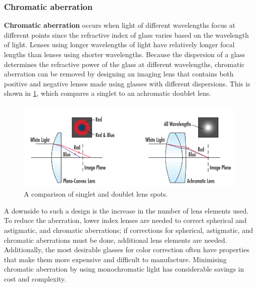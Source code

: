 \documentclass[10pt]{article}
\begin{document}
\begin{multicols}{2}
\subsubsection{Chromatic aberration}
\textbf{Chromatic aberration} occurs when light of different wavelengths focus at different points since the refractive index of glass varies based on the wavelength of light. Lenses using longer wavelengths of light have relatively longer focal lengths than lenses using shorter wavelengths. Because the dispersion of a glass determines the refractive power of the glass at different wavelengths, chromatic aberration can be removed by designing an imaging lens that contains both positive and negative lenses made using glasses with different dispersions. This is shown in \ref{fig:chromatic}, which compares a singlet to an achromatic doublet lens.
\begin{figure}[H]
    \centering
    \includegraphics[width=0.8\linewidth]{Images/Week 1/chromatic.png}
    \caption{A comparison of singlet and doublet lens spots.}
    \label{fig:chromatic}
\end{figure}
A downside to such a design is the increase in the number of lens elements used. To reduce the aberration, lower index lenses are needed to correct spherical and astigmatic, and chromatic aberrations; if corrections for spherical, astigmatic, and chromatic aberrations must be done, additional lens elements are needed. Additionally, the most desirable glasses for color correction often have properties that make them more expensive and difficult to manufacture. Minimising chromatic aberration by using monochromatic light has considerable savings in cost and complexity.
\newline \newline

\end{multicols}
\end{document}
